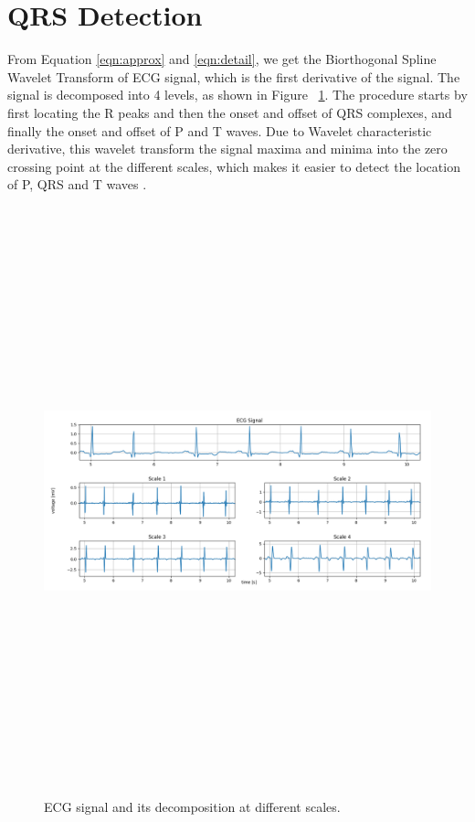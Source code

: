 \section{QRS Detection}\label{sec:ecg_det}

From Equation \ref{eqn:approx} and \ref{eqn:detail}, we get the Biorthogonal Spline Wavelet Transform of ECG signal, which is the first derivative of the signal. The signal is decomposed into 4 levels, as shown in  Figure ~\ref{fig:detail_coefficients}. The procedure starts by first locating the R peaks and then the onset and offset of QRS complexes, and finally the onset and offset of P and T waves. Due to Wavelet characteristic derivative, this wavelet transform the signal maxima and minima into the zero crossing point at the different scales, which makes it easier to detect the location of P, QRS and T waves \cite{e2010cardiac}.


\begin{figure}[htpb]
	\centering
	\includegraphics[width=14cm,height=17cm,keepaspectratio=true]{images/detail_coefficients}
	\caption{
		ECG signal and its decomposition at different scales.
	}
	\label{fig:detail_coefficients}
\end{figure}

